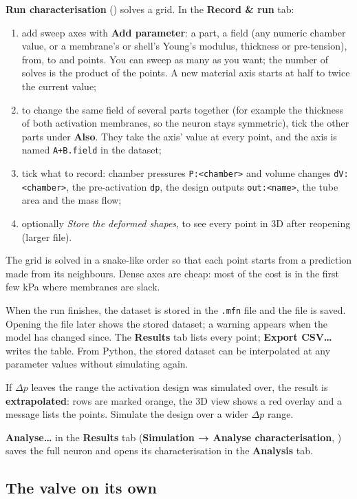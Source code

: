 \documentclass[11pt,a4paper]{article}
\newcommand{\code}[1]{\texttt{#1}}
\newcommand{\menu}[1]{\textsf{\textbf{#1}}}
\newcommand{\key}[1]{\fbox{\footnotesize\textsf{#1}}}
\begin{document}
\menu{Run characterisation} (\key{F6}) solves a grid. In the \menu{Record \& run} tab:
\begin{enumerate}
\item add sweep axes with \menu{Add parameter}: a part, a field (any numeric chamber value, or a membrane's or
  shell's Young's modulus, thickness or pre-tension), from, to and points. You can sweep as many as you want; the
  number of solves is the product of the points. A new material axis starts at half to twice the current value;
\item to change the same field of several parts together (for example the thickness of both activation membranes, so
  the neuron stays symmetric), tick the other parts under \menu{Also}. They take the axis' value at every point, and
  the axis is named \code{A+B.field} in the dataset;
\item tick what to record: chamber pressures \code{P:<chamber>} and volume changes \code{dV:<chamber>}, the
  pre-activation \code{dp}, the design outputs \code{out:<name>}, the tube area and the mass flow;
\item optionally \emph{Store the deformed shapes}, to see every point in 3D after reopening (larger file).
\end{enumerate}
The grid is solved in a snake-like order so that each point starts from a prediction made from its neighbours.
Dense axes are cheap: most of the cost is in the first few kPa where membranes are slack.

When the run finishes, the dataset is stored in the \code{.mfn} file and the file is saved. Opening the file later
shows the stored dataset; a warning appears when the model has changed since. The \menu{Results} tab lists every
point; \menu{Export CSV…} writes the table. From Python, the stored dataset can be interpolated at any parameter
values without simulating again.

\begin{warn}
If $\Delta p$ leaves the range the activation design was simulated over, the result is \textbf{extrapolated}: rows are
marked orange, the 3D view shows a red overlay and a message lists the points. Simulate the design over a wider
$\Delta p$ range.
\end{warn}

\menu{Analyse…} in the \menu{Results} tab (\menu{Simulation → Analyse characterisation}, \key{F7}) saves the full
neuron and opens its characterisation in the \menu{Analysis} tab.

\subsection{The valve on its own}
\label{sec:valveonly}
\end{document}

